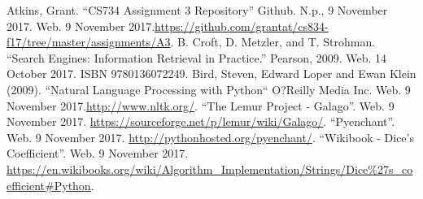\documentclass[letterpaper,11pt]{article}
\begin{document}
\clearpage


\begin{thebibliography}{9}
Atkins, Grant. ``CS734 Assignment 3 Repository'' Github. N.p., 9 November 2017. Web. 9 November 2017.\url{https://github.com/grantat/cs834-f17/tree/master/assignments/A3}.
B. Croft, D. Metzler, and T. Strohman. ``Search Engines: Information Retrieval in Practice.'' Pearson, 2009. Web. 14 October 2017. ISBN 9780136072249.
Bird, Steven, Edward Loper and Ewan Klein (2009). ``Natural Language Processing with Python`` O?Reilly Media Inc. Web. 9 November 2017.\url{http://www.nltk.org/}.
``The Lemur Project - Galago''. Web. 9 November 2017. \url{https://sourceforge.net/p/lemur/wiki/Galago/}.
``Pyenchant''. Web. 9 November 2017. \url{http://pythonhosted.org/pyenchant/}.
``Wikibook - Dice's Coefficient''. Web. 9 November 2017. \url{https://en.wikibooks.org/wiki/Algorithm_Implementation/Strings/Dice%27s_coefficient#Python}.
\end{thebibliography}
\end{document}

